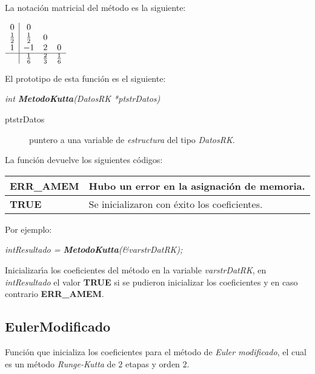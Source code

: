 La notaci\'on matricial del m\'etodo es la siguiente:

\begin{center}
$
\begin{array}{c|ccc}
0 & 0 \\
\frac{1}{2} & \frac{1}{2} & 0 \\
1 & -1 & 2 & 0 \\
\hline
 & \frac{1}{6} & \frac{2}{3} & \frac{1}{6}
\end{array}
$
\end{center}

El prototipo de esta funci\'on es el siguiente:

\begin{center}
\emph{int \textbf{MetodoKutta}(DatosRK *ptstrDatos)}
\end{center}

\begin{description}
\item[ptstrDatos] puntero a una variable de \emph{estructura} del tipo
\emph{DatosRK}.
\end{description}

La funci\'on devuelve los siguientes c\'odigos:

\begin{center}
\begin{tabular}{|l|l|}
\hline
\textbf{ERR\_AMEM} & Hubo un error en la asignaci\'on de memoria. \\
\hline
\textbf{TRUE} & Se inicializaron con \'exito los coeficientes. \\
\hline
\end{tabular}
\end{center}

Por ejemplo:

\begin{center}
\emph{intResultado = \textbf{MetodoKutta}(\&varstrDatRK);}
\end{center}

Inicializar\'{\i}a los coeficientes del m\'etodo en la variable
\emph{varstrDatRK}, en \emph{intResultado} el valor \textbf{TRUE} si se pudieron
inicializar los coeficientes y en caso contrario \textbf{ERR\_AMEM}.

\newpage

\subsection{EulerModificado}

Funci\'on que inicializa los coeficientes para el m\'etodo de \emph{Euler 
modificado}, el cual es un m\'etodo \emph{Runge-Kutta} de $2$ etapas y 
orden $2$.\newline


